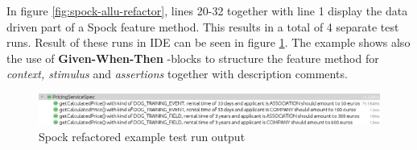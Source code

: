     \restoregeometry
    In figure \ref{fig:spock-allu-refactor}, lines 20-32 together with line 1 display the data driven part of a Spock
    feature method. This results in a total of
    4 separate test runs. Result of these runs in IDE can be seen in figure \ref{fig:spock-allu-refactor-output}. The
    example shows also the use of \textbf{Given-When-Then} -blocks to structure the feature method for \textit{context, stimulus}
    and \textit{assertions} together with description comments.

    \begin{figure}[H]
      \begin{center}
        \begin{topbot}[style=mdstyle]
        \includegraphics[width=\textwidth]{images/spock-pricing-results.png}
        \end{topbot}
        \caption{Spock refactored example test run output}
        \label{fig:spock-allu-refactor-output}
      \end{center}
    \end{figure}

